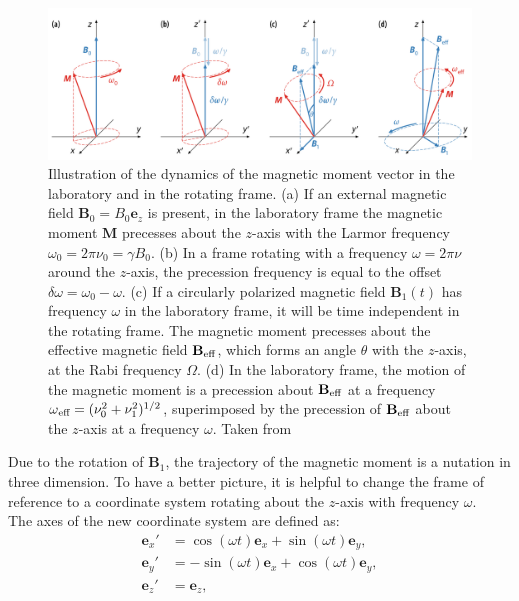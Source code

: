 \documentclass[a4paper]{book}
\newcommand{\tsub}{\textsubscript}
\newcommand{\mb}{\mathbf}
\newcommand{\mbe}{\mathbf{e}}
\begin{document}
	\begin{figure}
		\centering
		\includegraphics[width=\textwidth]{images/2_rotating_frame}
		\caption{Illustration of the dynamics of the magnetic moment vector in the laboratory and in the rotating frame. (a) If an external magnetic field $\mb B_0 = B_0\mbe_z$ is present, in the laboratory frame the magnetic moment $\mb M$ precesses about the $z$-axis with the Larmor frequency $\omega_0 = 2\pi\nu_0 = \gamma B_0$. (b) In a frame rotating with a frequency $\omega = 2\pi\nu$ around the $z$-axis, the precession frequency is equal to the offset $\delta\omega = \omega_0 - \omega$. (c) If a circularly polarized magnetic field $\mb B_1(t)$ has frequency $\omega$ in the laboratory frame, it will be time independent in the rotating frame. The magnetic moment precesses about the effective magnetic field $\mb B\tsub{eff}$, which forms an angle $\theta$ with the $z$-axis, at the Rabi frequency $\Omega$. (d) In the laboratory frame, the motion of the magnetic moment is a precession about $\mb B\tsub{eff}$ at a frequency $\omega\tsub{eff} = (\nu_0^2 + \nu_1^2)^{1/2}$, superimposed by the precession of $\mb B\tsub{eff}$ about the $z$-axis at a frequency $\omega$. Taken from \cite{moserChargeTransportAmorphous2019}}
		\label{fig:2_rotating_frame}
	\end{figure}
	Due to the rotation of $\mb B_1$, the trajectory of the magnetic moment is a nutation in three dimension. To have a better picture, it is helpful to change the frame of reference to a coordinate system rotating about the $z$-axis with frequency $\omega$.\\
	The axes of the new coordinate system are defined as:
	\begin{subequations}
		\label{eq:2_rotating_frame}
		\begin{align}
			\mbe_x' & = \cos(\omega t)\mbe_x + \sin(\omega t)\mbe_y,\\
			\mbe_y' & = - \sin(\omega t)\mbe_x + \cos(\omega t)\mbe_y,\\
			\mbe_z' & = \mbe_z,
		\end{align}
	\end{subequations}
\end{document}
